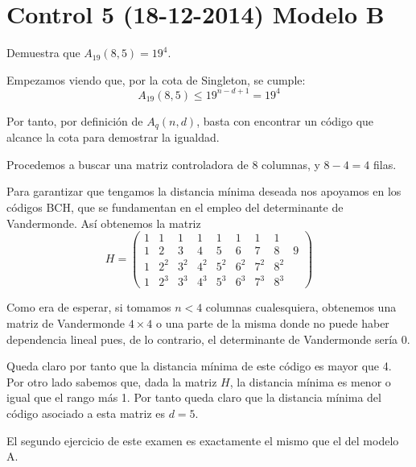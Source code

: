 \section{Control 5 (18-12-2014) Modelo B}
\begin{problem}[1]
Demuestra que $A_{19}(8,5)=19^4$.
\solution

Empezamos viendo que, por la cota de Singleton, se cumple:
\[A_{19}(8,5) \leq 19^{n-d+1}=19^4\]

Por tanto, por definición de $A_q(n,d)$, basta con encontrar un código que alcance la cota para demostrar la igualdad.

Procedemos a buscar una matriz controladora de $8$ columnas, y $8-4=4$ filas.

Para garantizar que tengamos la distancia mínima deseada nos apoyamos en los códigos BCH, que se fundamentan en el empleo del determinante de Vandermonde. Así obtenemos la matriz
\[H = \left(\begin{array}{ccccccccc}
1 & 1 & 1 & 1 & 1 & 1 & 1 & 1 \\
1 & 2 & 3 & 4 & 5 & 6 & 7 & 8 & 9 \\
1 & 2^2 & 3^2 & 4^2 & 5^2 & 6^2 & 7^2 & 8^2 \\
1 & 2^3 & 3^3 & 4^3 & 5^3 & 6^3 & 7^3 & 8^3
\end{array} \right)\]

Como era de esperar, si tomamos $n<4$ columnas cualesquiera, obtenemos una matriz de Vandermonde $4\times 4$ o una parte de la misma donde no puede haber dependencia lineal pues, de lo contrario, el determinante de Vandermonde sería 0.

Queda claro por tanto que la distancia mínima de este código es mayor que 4. Por otro lado sabemos que, dada la matriz $H$, la distancia mínima es menor o igual que el rango más 1. Por tanto queda claro que la distancia mínima del código asociado a esta matriz es $d=5$.
\end{problem}

El segundo ejercicio de este examen es exactamente el mismo que el del modelo A.
